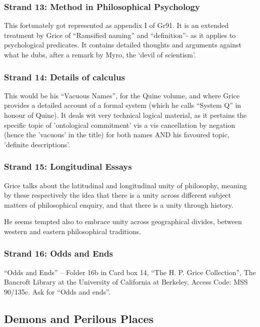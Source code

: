 \documentclass[10pt,titlepage]{book}
\begin{document}
\subsubsection{Strand 13: Method in Philosophical Psychology}

This fortunately got represented as appendix I of Gr91\cite{grice91}.
It is an extended treatment by Grice of ``Ramsified naming'' and ``definition''- as it applies to psychological predicates.
It contains detailed thoughts and arguments against what he dubs, after a remark by Myro, the `devil of scientism'. 
 
\subsubsection{Strand 14: Details of calculus}

This would be his ``Vacuous Names'', for the Quine volume, and where Grice provides a detailed account of a formal system (which he calls ``System Q'' in honour of Quine).
It deals wit very technical logical material, as it pertains the specific topic of 'ontological commitment' vis a vis cancellation by negation (hence the 'vacuous' in the title) for both names AND his favoured topic, 'definite descriptions'.
 
\subsubsection{Strand 15: Longitudinal Essays}

Grice talks about the latitudinal and longitudinal unity of philosophy, meaning by these respectively the idea that there is a unity across different subject matters of philosophical enquiry, and that there is a unity through history.

He seems tempted also to embrace unity across geographical divides, between western and eastern philosophical traditions.

\subsubsection{Strand 16: Odds and Ends}

``Odds and Ends'' -- Folder 16b in Card box 14, ``The H. P. Grice Collection'', The Bancroft Library at the University of California at Berkeley, Access Code: MSS 90/135c.
Ask for ``Odds and ends''.

\subsection{Demons and Perilous Places}\label{demons}
\end{document}
